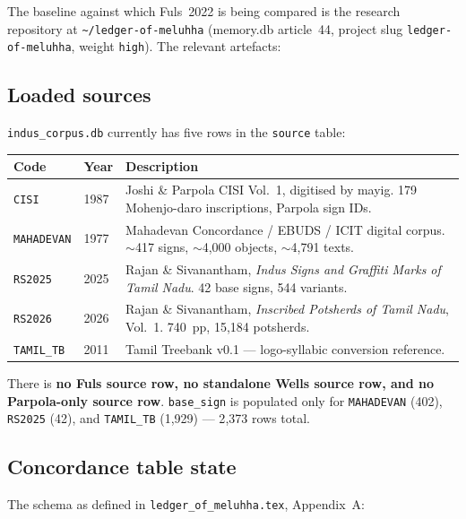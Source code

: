 \documentclass[12pt, a4paper]{article}
\newcommand{\db}[1]{\texttt{#1}}
\begin{document}
The baseline against which Fuls~2022 is being compared is the
research repository at \db{\textasciitilde/ledger-of-meluhha}
(memory.db article~44, project slug \db{ledger-of-meluhha},
weight \db{high}).
The relevant artefacts:

\subsection{Loaded sources}

\db{indus\_corpus.db} currently has five rows in the \db{source}
table:

\begin{center}
\small
\renewcommand{\arraystretch}{1.15}
\begin{tabular}{@{}l l p{8.6cm}@{}}
\toprule
\textbf{Code} & \textbf{Year} & \textbf{Description}\\
\midrule
\db{CISI}      & 1987 & Joshi \& Parpola CISI Vol.~1, digitised by mayig.
                       179 Mohenjo-daro inscriptions, Parpola sign IDs.\\
\db{MAHADEVAN} & 1977 & Mahadevan Concordance / EBUDS / ICIT digital corpus.
                       $\sim$417 signs, $\sim$4{,}000 objects, $\sim$4{,}791 texts.\\
\db{RS2025}    & 2025 & Rajan \& Sivanantham, \textit{Indus Signs and
                       Graffiti Marks of Tamil Nadu}. 42 base signs,
                       544 variants.\\
\db{RS2026}    & 2026 & Rajan \& Sivanantham, \textit{Inscribed Potsherds
                       of Tamil Nadu}, Vol.~1.  740~pp, 15{,}184 potsherds.\\
\db{TAMIL\_TB} & 2011 & Tamil Treebank v0.1 --- logo-syllabic conversion
                       reference.\\
\bottomrule
\end{tabular}
\end{center}

There is \textbf{no Fuls source row, no standalone Wells source row,
and no Parpola-only source row}.  \db{base\_sign} is populated only
for \db{MAHADEVAN} (402), \db{RS2025} (42), and \db{TAMIL\_TB}
(1{,}929) --- 2{,}373 rows total.

\subsection{Concordance table state}

The schema as defined in \texttt{ledger\_of\_meluhha.tex},
Appendix~A:
\end{document}
